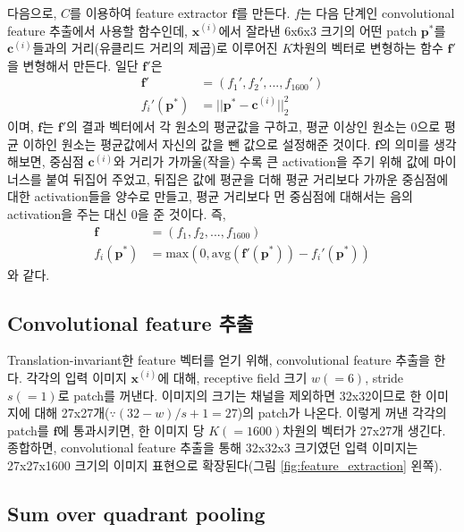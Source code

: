 \documentclass[a4paper,9pt,hidelinks]{article}
\begin{document}
\begin{multicols*}{2}
다음으로, $C$를 이용하여 feature extractor $\mathbf{f}$를 만든다.
$f$는 다음 단계인 convolutional feature 추출에서 사용할 함수인데, $\mathbf{x}^{(i)}$에서 잘라낸 6x6x3 크기의 어떤 patch $\mathbf{p}^{*}$를 $\mathbf{c}^{(i)}$들과의 거리(유클리드 거리의 제곱)로 이루어진 $K$차원의 벡터로 변형하는 함수 $\mathbf{f}'$을 변형해서 만든다.
일단 $\mathbf{f}'$은
\begin{align*}
    \mathbf{f}' &= (f_{1}', f_{2}', ..., f_{1600}') \\
    f_{i}'(\mathbf{p}^{*}) &= || \mathbf{p}^{*} - \mathbf{c}^{(i)} ||_2^2
\end{align*}
이며, $\mathbf{f}$는 $\mathbf{f}'$의 결과 벡터에서 각 원소의 평균값을 구하고, 평균 이상인 원소는 0으로 평균 이하인 원소는 평균값에서 자신의 값을 뺀 값으로 설정해준 것이다.
$\mathbf{f}$의 의미를 생각해보면, 중심점 $\mathbf{c}^{(i)}$와 거리가 가까울(작을) 수록 큰 activation을 주기 위해 값에 마이너스를 붙여 뒤집어 주었고, 뒤집은 값에 평균을 더해 평균 거리보다 가까운 중심점에 대한 activation들을 양수로 만들고, 평균 거리보다 먼 중심점에 대해서는 음의 activation을 주는 대신 0을 준 것이다.
즉,
\begin{align*}
    \mathbf{f} &= (f_{1}, f_{2}, ..., f_{1600}) \\
    f_{i}(\mathbf{p}^{*}) &= \text{max} ( 0, \text{avg} (\mathbf{f}'(\mathbf{p}^{*})) - f_{i}'(\mathbf{p}^{*}) )
\end{align*}
와 같다.

\subsection{Convolutional feature 추출}

Translation-invariant한 feature 벡터를 얻기 위해, convolutional feature 추출을 한다.
각각의 입력 이미지 $\mathbf{x}^{(i)}$에 대해, receptive field 크기 $w(=6)$, stride $s(=1)$로 patch를 꺼낸다.
이미지의 크기는 채널을 제외하면 32x32이므로 한 이미지에 대해 27x27개($\because (32-w)/s+1=27$)의 patch가 나온다.
이렇게 꺼낸 각각의 patch를 $\mathbf{f}$에 통과시키면, 한 이미지 당 $K(=1600)$차원의 벡터가 27x27개 생긴다.
종합하면, convolutional feature 추출을 통해 32x32x3 크기였던 입력 이미지는 27x27x1600 크기의 이미지 표현으로 확장된다(그림 \ref{fig:feature_extraction} 왼쪽).

\subsection{Sum over quadrant pooling}
\label{sec:quadrant_pooling}


\end{multicols*}
\end{document}
